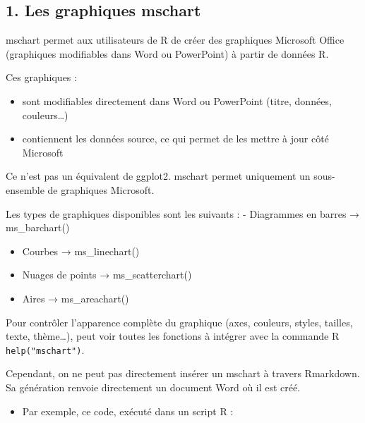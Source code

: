\documentclass[
]{article}
\providecommand{\tightlist}{%
  \setlength{\itemsep}{0pt}\setlength{\parskip}{0pt}}
\begin{document}
\subsection{1. Les graphiques mschart}\label{les-graphiques-mschart}

mschart permet aux utilisateurs de R de créer des graphiques Microsoft
Office (graphiques modifiables dans Word ou PowerPoint) à partir de
données R.

Ces graphiques :

\begin{itemize}
\item
  sont modifiables directement dans Word ou PowerPoint (titre, données,
  couleurs\ldots)
\item
  contiennent les données source, ce qui permet de les mettre à jour
  côté Microsoft
\end{itemize}

Ce n'est pas un équivalent de ggplot2. mschart permet uniquement un
sous-ensemble de graphiques Microsoft.

Les types de graphiques disponibles sont les suivants : - Diagrammes en
barres → ms\_barchart()

\begin{itemize}
\item
  Courbes → ms\_linechart()
\item
  Nuages de points → ms\_scatterchart()
\item
  Aires → ms\_areachart()
\end{itemize}

Pour contrôler l'apparence complète du graphique (axes, couleurs,
styles, tailles, texte, thème\ldots), peut voir toutes les fonctions à
intégrer avec la commande R \texttt{help("mschart")}.

Cependant, on ne peut pas directement insérer un mschart à travers
Rmarkdown. Sa génération renvoie directement un document Word où il est
créé.

\begin{itemize}
\tightlist
\item
  Par exemple, ce code, exécuté dans un script R :
\end{itemize}
\end{document}
